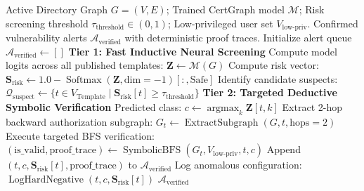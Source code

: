 \begin{algorithm}[ht]
\caption{Two-Tier Neuro-Symbolic Vulnerability Auditor}
\label{alg:neuro_symbolic}
\begin{algorithmic}[1]
\Require Active Directory Graph $G = (V, E)$; Trained CertGraph model $\mathcal{M}$; Risk screening threshold $\tau_{\text{threshold}} \in (0, 1)$; Low-privileged user set $V_{\text{low-priv}}$.
\Ensure Confirmed vulnerability alerts $\mathcal{A}_{\text{verified}}$ with deterministic proof traces.
\State Initialize alert queue $\mathcal{A}_{\text{verified}} \gets []$
\State \textbf{Tier 1: Fast Inductive Neural Screening}
\State Compute model logits across all published templates: $\mathbf{Z} \gets \mathcal{M}(G)$
\State Compute risk vector: $\mathbf{S}_{\text{risk}} \gets 1.0 - \operatorname{Softmax}(\mathbf{Z}, \text{dim}=-1)[:, \text{Safe}]$
\State Identify candidate suspects: $\mathcal{Q}_{\text{suspect}} \gets \{t \in V_{\text{Template}} \mid \mathbf{S}_{\text{risk}}[t] \ge \tau_{\text{threshold}}\}$
\State \textbf{Tier 2: Targeted Deductive Symbolic Verification}
    \State Predicted class: $c \gets \operatorname{argmax}_k \mathbf{Z}[t, k]$
    \State Extract 2-hop backward authorization subgraph: $G_t \gets \operatorname{ExtractSubgraph}(G, t, \text{hops}=2)$
    \State Execute targeted BFS verification: $(\text{is\_valid}, \text{proof\_trace}) \gets \operatorname{SymbolicBFS}(G_t, V_{\text{low-priv}}, t, c)$
        \State Append $(t, c, \mathbf{S}_{\text{risk}}[t], \text{proof\_trace})$ to $\mathcal{A}_{\text{verified}}$
    \Else
        \State Log anomalous configuration: $\operatorname{LogHardNegative}(t, c, \mathbf{S}_{\text{risk}}[t])$
    \EndIf
\EndFor
\State \Return $\mathcal{A}_{\text{verified}}$
\end{algorithmic}
\end{algorithm}

